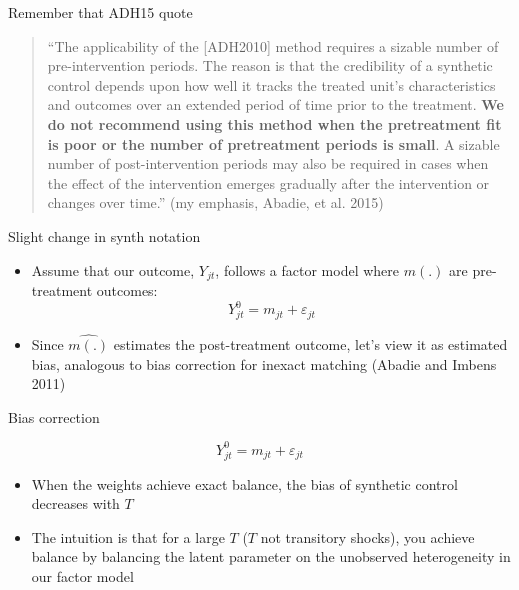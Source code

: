 \documentclass{beamer}
\begin{document}
\begin{frame}{Remember that ADH15 quote}

\begin{quote}
``The applicability of the [ADH2010] method requires a sizable number of pre-intervention periods. The reason is that the credibility of a synthetic control depends upon how well it tracks the treated unit’s characteristics and outcomes over an extended period of time prior to the treatment. \textbf{We do not recommend using this method when the pretreatment fit is poor or the number of pretreatment periods is small}. A sizable number of post-intervention periods may also be required in cases when the effect of the intervention emerges gradually after the intervention or changes over time.'' (my emphasis, Abadie, et al. 2015)
\end{quote}

\end{frame}

\begin{frame}{Slight change in synth notation}

\begin{itemize}
\item Assume that our outcome, $Y_{jt}$, follows a factor model where $m(.)$ are pre-treatment outcomes: $$ Y_{jt}^0 = m_{jt} + \varepsilon_{jt}$$
\item Since $\widehat{m(.)}$ estimates the post-treatment outcome, let's view it as estimated bias, analogous to bias correction for inexact matching (Abadie and Imbens 2011)
\end{itemize}

\end{frame}



\begin{frame}{Bias correction}

 $$ Y_{jt}^0 = m_{jt} + \varepsilon_{jt}$$

\begin{itemize}
\item When the weights achieve exact balance, the bias of synthetic control decreases with $T$
\item The intuition is that for a large $T$ ($T$ not transitory shocks), you achieve balance by balancing the latent parameter on the unobserved heterogeneity in our factor model
\end{itemize}

\end{frame}
\end{document}
